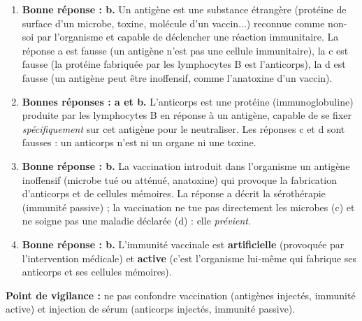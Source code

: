 \documentclass[11pt]{article}
\newcommand{\cle}[1]{{\popxbold\color{popdark}#1}}
\begin{document}
\begin{corrige}
\begin{enumerate}
\item \textbf{Bonne réponse : b.} Un antigène est une substance étrangère (protéine de surface d'un microbe, toxine, molécule d'un vaccin...) reconnue comme \cle{non-soi} par l'organisme et capable de déclencher une \cle{réaction immunitaire}. La réponse a est fausse (un antigène n'est pas une cellule immunitaire), la c est fausse (la protéine fabriquée par les lymphocytes B est l'\cle{anticorps}), la d est fausse (un antigène peut être inoffensif, comme l'\cle{anatoxine} d'un vaccin).
\item \textbf{Bonnes réponses : a et b.} L'anticorps est une protéine (\cle{immunoglobuline}) produite par les \cle{lymphocytes B} en réponse à un antigène, capable de se fixer \emph{spécifiquement} sur cet antigène pour le \cle{neutraliser}. Les réponses c et d sont fausses : un anticorps n'est ni un organe ni une toxine.
\item \textbf{Bonne réponse : b.} La \cle{vaccination} introduit dans l'organisme un antigène inoffensif (microbe tué ou atténué, anatoxine) qui provoque la fabrication d'anticorps et de \cle{cellules mémoires}. La réponse a décrit la \cle{sérothérapie} (immunité passive) ; la vaccination ne tue pas directement les microbes (c) et ne soigne pas une maladie déclarée (d) : elle \emph{prévient}.
\item \textbf{Bonne réponse : b.} L'immunité vaccinale est \textbf{artificielle} (provoquée par l'intervention médicale) et \textbf{active} (c'est l'organisme lui-même qui fabrique ses anticorps et ses cellules mémoires).
\end{enumerate}
\textbf{Point de vigilance :} ne pas confondre vaccination (antigènes injectés, immunité active) et injection de sérum (anticorps injectés, immunité passive).
\end{corrige}
\end{document}
